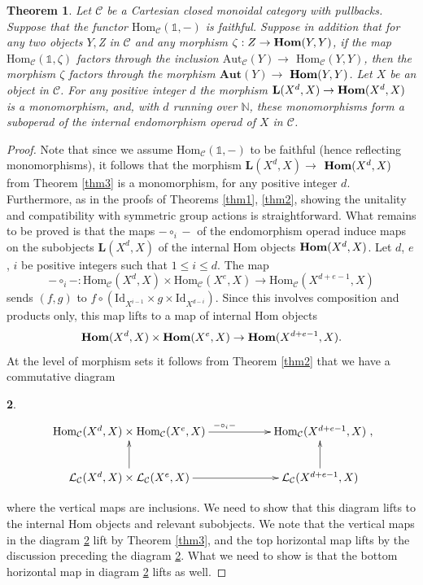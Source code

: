 \documentclass{amsart} %
\theoremstyle{plain}\newtheorem{Theorem}{Theorem}[section]
\theoremstyle{plain}\newtheorem{Conjecture}[Theorem]{Conjecture}
\theoremstyle{plain}\newtheorem{Corollary}[Theorem]{Corollary}
\theoremstyle{plain}\newtheorem{Lemma}[Theorem]{Lemma}
\theoremstyle{plain}\newtheorem{Proposition}[Theorem]{Proposition}
\theoremstyle{definition}\newtheorem{Definition}[Theorem]{Definition}
\theoremstyle{definition}\newtheorem{Example}[Theorem]{Example}
\theoremstyle{definition}\newtheorem{Examples}[Theorem]{Examples}
\theoremstyle{definition}\newtheorem{Remark}[Theorem]{Remark}
\theoremstyle{definition}\newtheorem{Remarks}[Theorem]{Remarks}
\theoremstyle{plain}\newtheorem{Statement}[Theorem]{}
\def\CC{{\mathcal{C}}}    \def\OP{{\mathcal{O}P}}
\def\CL{{\mathcal{L}}}  \def\bCL{{\mathbf{L}}}
\def\N{{\mathbb N}}
\def\One{{\mathds{1}}}
\def\Aut{\mathrm{Aut}}   \def\bAut{\mathbf{Aut}}        \def\tenk{\otimes_k}
\def\Hom{\mathrm{Hom}}           \def\tenkS{\otimes_{kS}}
\def\Id{\mathrm{Id}}             \def\tenA{\otimes_A}
\begin{document}
\begin{Theorem} \label{thm4} 
Let $\CC$ be a Cartesian closed monoidal category with pullbacks. 
Suppose that the functor $\Hom_\CC(\One,-)$ is faithful. 
Suppose in addition  that 
for any two objects $Y, $Z$ $ in $\CC$ and any morphism $\zeta :  Z \to \mathbf{Hom}(Y,Y)$, 
if the map $\Hom_\CC(\One,\zeta)$ factors through the inclusion $\Aut_\CC(Y)\to$
$\Hom_\CC(Y,Y)$, then the morphism
$\zeta$ factors through the morphism $\bAut(Y) \to $ $ \mathbf{Hom}(Y,Y)$.
Let $X$ be an object in $\CC$. For any positive integer $d$  the morphism
$\bCL(X^d,X) \to \bHom(X^d,X)$ is a monomorphism, and, with $d$ running over $\N$, these
monomorphisms form a suboperad of the internal endomorphism operad of $X$  in $\CC$.
\end{Theorem}

\begin{proof} 
Note that since we assume $\Hom_\CC(\One,-)$ to be faithful (hence
reflecting monomorphisms), it follows that the morphism $\bCL(X^d,X)\to$ $\mathbf{Hom}(X^d,X)$
from Theorem \ref{thm3}  is a monomorphism, for any positive integer $d$.
Furthermore, as in the proofs of Theorems \ref{thm1}, \ref{thm2}, 
showing the unitality and  compatibility with symmetric group actions is
straightforward. What remains to be proved is that the maps $- \circ_i -$ of the 
endomorphism operad induce maps on the subobjects $\bCL(X^d,X)$ of the
internal Hom objects $\mathbf{Hom}(X^d,X)$. Let $d$, $e$, $i$  be positive integers such that
$1\leq i\leq d$. The map
$$ - \circ_i - : \Hom_\CC(X^d,X) \times \Hom_\CC(X^e,X) \to \Hom_\CC(X^{d+e-1},X)$$
sends $(f,g)$ to $f\circ (\Id_{X^{i-1}} \times g \times \Id_{X^{d-i}})$. Since this involves
composition and products only, this map lifts to a map of internal Hom objects
$$ \mathbf{Hom}(X^d,X) \times \mathbf{Hom}(X^e,X) \to \mathbf{Hom}(X^{d+e-1}, X).$$  
At the level of morphism
sets it follows from Theorem \ref{thm2} that we have a commutative diagram
\begin{Statement} \label{lift} 
$$ \xymatrix{
\Hom_\CC(X^d,X) \times \Hom_\CC(X^e,X) \ar[rr]^{-\circ_i - } & & \Hom_\CC(X^{d+e-1},X) \\
\CL_\CC(X^d,X) \times \CL_\CC(X^e,X) \ar[u] \ar[rr] & & \CL_\CC(X^{d+e-1},X) \ar[u] 
},$$
\end{Statement} 
where the vertical maps are inclusions.
We need to show that this diagram lifts to the internal Hom objects and relevant subobjects. We note that
the vertical maps in the diagram \ref{lift} lift by Theorem \ref{thm3}, and the top horizontal map lifts
by the discussion preceding the diagram \ref{lift}. What we need to show is that the bottom horizontal
map in diagram \ref{lift} lifts as well.


\end{proof}
\end{document}
